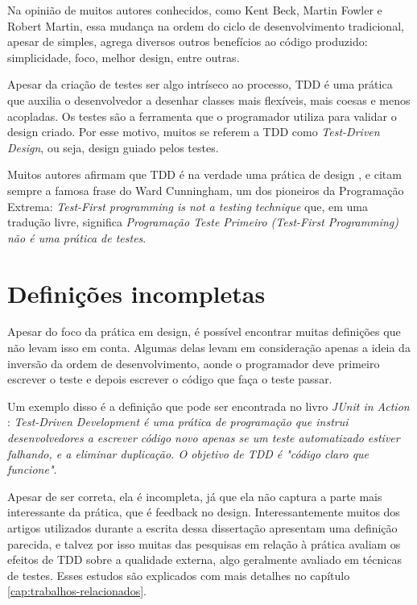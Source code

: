 Na opinião de muitos autores conhecidos, como Kent Beck, Martin Fowler e Robert
Martin, essa mudança na ordem do ciclo de desenvolvimento tradicional, apesar de
simples, agrega diversos outros benefícios ao código produzido: simplicidade,
foco, melhor design, entre outras.

Apesar da criação de testes ser algo intríseco ao processo, TDD é uma prática
que auxilia o desenvolvedor a desenhar classes mais flexíveis, mais coesas e
menos acopladas. Os testes são a ferramenta que o programador utiliza para
validar o design criado. Por esse motivo, muitos se referem a TDD como
\textit{Test-Driven Design}, ou seja, design guiado pelos testes.

Muitos autores afirmam que TDD é na verdade uma prática de design
\cite{tdd-taxonomy} \cite{aim-fire}, e citam sempre a famosa frase do Ward
Cunningham, um dos pioneiros da Programação Extrema: \textit{Test-First
programming is not a testing technique} que, em uma tradução livre, significa
\textit{Programação Teste Primeiro (Test-First Programming) não é uma prática
de testes}.

\section{Definições incompletas}

Apesar do foco da prática em design, é possível encontrar muitas definições que
não levam isso em conta. Algumas delas levam em consideração apenas a ideia da
inversão da ordem de desenvolvimento, aonde o programador deve primeiro escrever
o teste e depois escrever o código que faça o teste passar.

Um exemplo disso é a definição que pode ser encontrada no livro \textit{JUnit
in Action} \cite{junit-in-action}: \textit{Test-Driven Development é uma
prática de programação que instrui desenvolvedores a escrever código novo
apenas se um teste automatizado estiver falhando, e a eliminar duplicação. O
objetivo de TDD é "código claro que funcione"}.

Apesar de ser correta, ela é incompleta, já que ela não captura a parte mais
interessante da prática, que é feedback no design. Interessantemente muitos
dos artigos utilizados durante a escrita dessa dissertação apresentam uma
definição parecida, e talvez por isso muitas das pesquisas em relação à prática
avaliam os efeitos de TDD sobre a qualidade externa, algo geralmente avaliado em
técnicas de testes. Esses estudos são explicados com mais detalhes no capítulo
\ref{cap:trabalhos-relacionados}.


